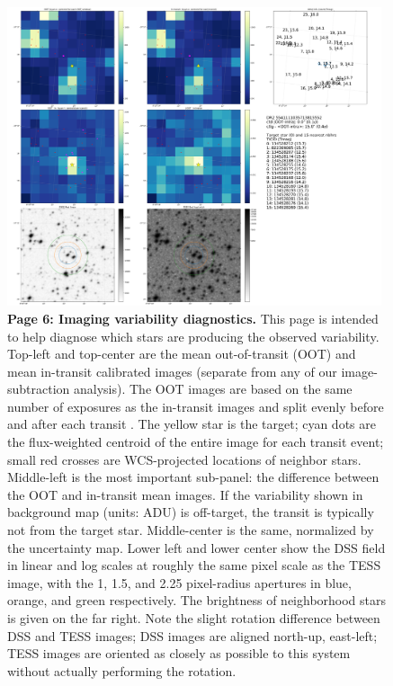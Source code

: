 \documentclass[12pt,twocolumn,tighten]{aastex62}
\begin{document}
\begin{figure}[!h]
	\begin{center}
		\leavevmode
		\includegraphics[width=0.98\textwidth]{gaiatwo0005541111035713815552-0007_page06.pdf}
	\end{center}
	\vspace{-0.5cm}
	\caption{
		{\bf Page 6: Imaging variability diagnostics.} 
		This page is intended to help diagnose which stars are producing the observed
		variability.
		Top-left and top-center are the mean out-of-transit (OOT) and mean in-transit 
		calibrated images (separate from any of our image-subtraction analysis).
		The OOT images are based on the same number of exposures as the in-transit images
		and split evenly before and after each transit \citep[following][]{bryson_identification_2013,kostov_l9859_2019}.
		The yellow star is the target; cyan dots are the flux-weighted centroid of the entire
		image for each transit event; small red crosses are WCS-projected locations of neighbor stars.
		Middle-left is the most important sub-panel: the difference between
		the OOT and in-transit mean images.
		If the variability shown in background map (units: ADU) is off-target, the
		transit is typically not from the target star.
		Middle-center is the same, normalized by the uncertainty map.
		Lower left and lower center show the DSS field in linear and log scales
		at roughly the same pixel scale as the TESS image,
		with the 1, 1.5, and 2.25 pixel-radius apertures in blue, orange, and green respectively.
		The brightness of neighborhood stars is given on the far right.
		Note the slight rotation difference between DSS and TESS images;
		DSS images are aligned north-up, east-left; TESS images are oriented as closely as
		possible to this system without actually performing the rotation.
		\label{fig:pg6}
	}
\end{figure}
\end{document}

